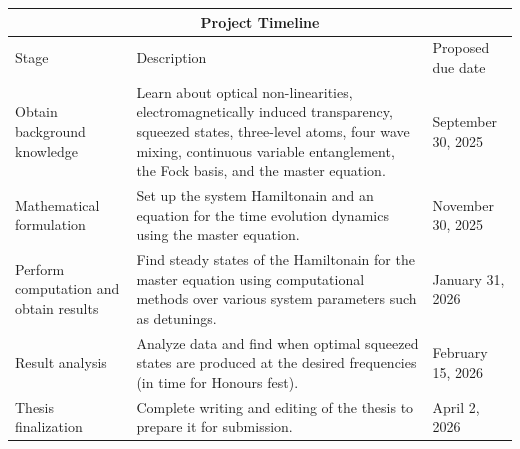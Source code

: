 \documentclass[aps,pra,showpacs,amsmath,amssymb,nofootinbib,longbibliography,superscriptaddress
]{revtex4-1}
\theoremstyle{definition}
\theoremstyle{remark}
\newcommand{\0}{\hat{0}}
\begin{document}
\begin{center}
    \begin{tabular}{ |p{4cm}||p{10cm}|p{3cm}|  }
        \hline
        \multicolumn{3}{|c|}{Project Timeline} \\
        \hline
        Stage &  Description & Proposed due date\\
        \hline
        \raggedright Obtain background knowledge & Learn about optical non-linearities, electromagnetically induced transparency, squeezed states, three-level atoms, four wave mixing, continuous variable entanglement, the Fock basis, and the master equation. & September 30, 2025\\
        \hline
        Mathematical formulation & Set up the system Hamiltonain and an equation for the time evolution dynamics using the master equation. & November 30, 2025\\
        \hline
        Perform computation and obtain results & Find steady states of the Hamiltonain for the master equation using computational methods over various system parameters such as detunings. & January 31, 2026\\
        \hline
        Result analysis & Analyze data and find when optimal squeezed states are produced at the desired frequencies (in time for Honours fest). & February 15, 2026\\
        \hline
        Thesis finalization & Complete writing and editing of the thesis to prepare it for submission. & April 2, 2026\\
        \hline
    \end{tabular}
\end{center}




\end{document}
